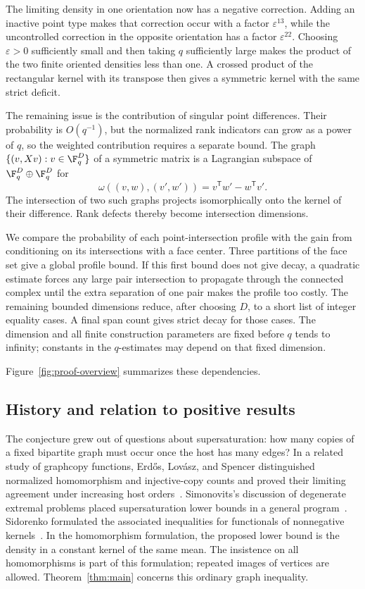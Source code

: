 The limiting density in one orientation now has a negative correction.
Adding an inactive point type makes that correction occur with a factor
\(\varepsilon^{13}\), while the uncontrolled correction in the
opposite orientation has a factor \(\varepsilon^{22}\). Choosing
\(\varepsilon>0\) sufficiently small and then taking \(q\) sufficiently
large makes the product of the two finite oriented densities less than
one. A crossed product of the rectangular kernel
with its transpose then gives a symmetric kernel with the same strict
deficit.

The remaining issue is the contribution of singular point
differences. Their probability is \(O(q^{-1})\), but the normalized
rank indicators can grow as a power of \(q\), so the weighted
contribution requires a separate bound. The graph
\(\{(v,Xv):v\in\F_q^D\}\) of a symmetric matrix is a Lagrangian
subspace of \(\F_q^D\oplus\F_q^D\) for
\[
 \omega((v,w),(v',w'))=v^{\mathsf T}w'-w^{\mathsf T}v'.
\]
The intersection of two such graphs projects isomorphically onto
the kernel of their difference. Rank defects thereby become
intersection dimensions.

We compare the probability of each point-intersection profile with
the gain from conditioning on its intersections with a face center.
Three partitions of the face set give a global profile bound. If this
first bound does not give decay, a quadratic estimate forces any large
pair intersection to propagate through the connected complex until
the extra separation of one pair makes the profile too costly. The
remaining bounded dimensions reduce, after choosing \(D\), to a
short list of integer equality cases. A final span count gives strict
decay for those cases. The dimension and all finite construction
parameters are fixed before \(q\) tends to infinity; constants in
the \(q\)-estimates may depend on that fixed dimension.

Figure~\ref{fig:proof-overview} summarizes these dependencies.



\subsection*{History and relation to positive results}

The conjecture grew out of questions about supersaturation: how many
copies of a fixed bipartite graph must occur once the host has many
edges? In a related study of graphcopy functions, Erd\H{o}s,
Lov\'asz, and Spencer distinguished normalized homomorphism and
injective-copy counts and proved their limiting agreement under
increasing host orders~\cite{erdoslovaszspencer1979}.
Simonovits's discussion of degenerate extremal problems placed
supersaturation lower bounds in a general program~\cite{simonovits1984}.
Sidorenko formulated the associated inequalities for functionals of
nonnegative kernels~\cite{sidorenko1991,sidorenko1993}.  In the
homomorphism formulation, the proposed lower bound is the density in
a constant kernel of the same mean.  The insistence on all
homomorphisms is part of this formulation; repeated images of vertices
are allowed.  Theorem~\ref{thm:main} concerns this ordinary graph
inequality.

